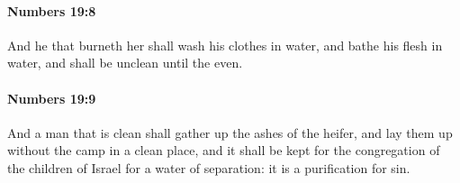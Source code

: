 		\paragraph{Numbers 19:8} %
			\label{NUMBERS-19-8}

			And he that burneth her shall wash his clothes in water, and bathe his flesh in water, and shall be unclean until the even.


		\paragraph{Numbers 19:9} %
			\label{NUMBERS-19-9}

			And a man that is clean shall gather up the ashes of the heifer, and lay them up without the camp in a clean place, and it shall be kept for the congregation of the children of Israel for a water of separation: it is a purification for sin.


